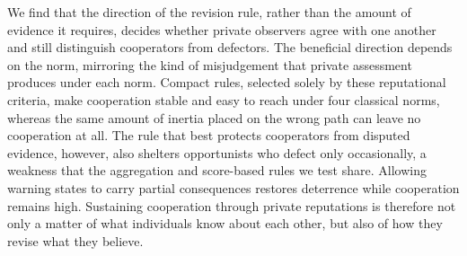 We find that the direction of the revision rule, rather than the amount of evidence it requires, decides whether private observers agree with one another and still distinguish cooperators from defectors. The beneficial direction depends on the norm, mirroring the kind of misjudgement that private assessment produces under each norm. Compact rules, selected solely by these reputational criteria, make cooperation stable and easy to reach under four classical norms, whereas the same amount of inertia placed on the wrong path can leave no cooperation at all. The rule that best protects cooperators from disputed evidence, however, also shelters opportunists who defect only occasionally, a weakness that the aggregation and score-based rules we test share. Allowing warning states to carry partial consequences restores deterrence while cooperation remains high. Sustaining cooperation through private reputations is therefore not only a matter of what individuals know about each other, but also of how they revise what they believe.

